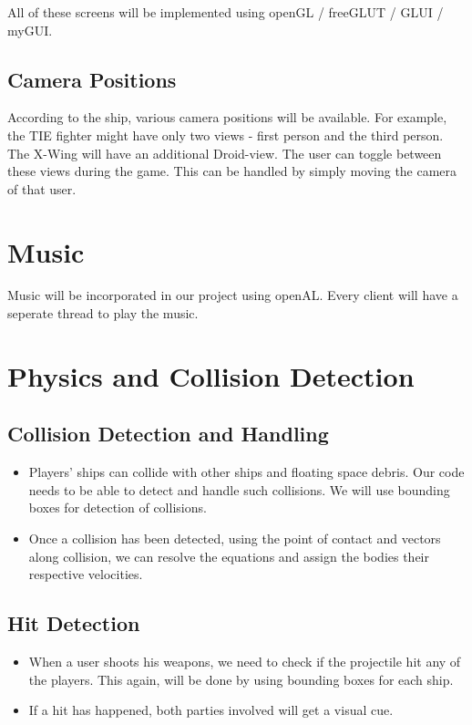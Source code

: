 \documentclass[]{article}
\begin{document}
\noindent All of these screens will be implemented using openGL / freeGLUT / GLUI / myGUI. %
\subsection{Camera Positions}
According to the ship, various camera positions will be available. For example, the TIE fighter might have only two views - first person and the third person. The X-Wing will have an additional Droid-view. The user can toggle between these views during the game. This can be handled by simply moving the camera of that user.
\section{Music}
Music will be incorporated in our project using openAL. Every client will have a seperate thread to play the music.
\section{Physics and Collision Detection}
\subsection{Collision Detection and Handling}
\begin{itemize}
\item Players' ships can collide with other ships and floating space debris. Our code needs to be able to detect and handle such collisions. We will use bounding boxes for detection of collisions.
\item Once a collision has been detected, using the point of contact and vectors along collision, we can resolve the equations and assign the bodies their respective velocities.
\end{itemize}
\subsection{Hit Detection}
\begin{itemize}

\item When a user shoots his weapons, we need to check if the projectile hit any of the players. This again, will be done by using bounding boxes for each ship.
\item If a hit has happened, both parties involved will get a visual cue.
\end{itemize}
\vfill

\end{document}

